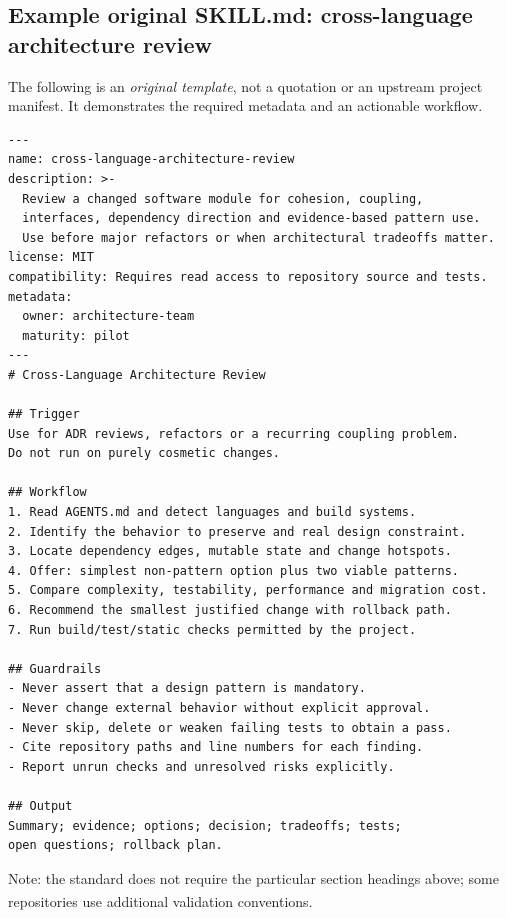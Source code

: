 \documentclass[11pt,letterpaper]{article}
\newcommand{\src}[1]{\textsuperscript{\textcolor{teal}{\cite{#1}}}}
\begin{document}
\subsection{Example original SKILL.md: cross-language architecture review}
The following is an \emph{original template}, not a quotation or an upstream project manifest. It demonstrates the required metadata and an actionable workflow.
\begin{lstlisting}[style=yamlstyle]
---
name: cross-language-architecture-review
description: >-
  Review a changed software module for cohesion, coupling,
  interfaces, dependency direction and evidence-based pattern use.
  Use before major refactors or when architectural tradeoffs matter.
license: MIT
compatibility: Requires read access to repository source and tests.
metadata:
  owner: architecture-team
  maturity: pilot
---
# Cross-Language Architecture Review

## Trigger
Use for ADR reviews, refactors or a recurring coupling problem.
Do not run on purely cosmetic changes.

## Workflow
1. Read AGENTS.md and detect languages and build systems.
2. Identify the behavior to preserve and real design constraint.
3. Locate dependency edges, mutable state and change hotspots.
4. Offer: simplest non-pattern option plus two viable patterns.
5. Compare complexity, testability, performance and migration cost.
6. Recommend the smallest justified change with rollback path.
7. Run build/test/static checks permitted by the project.

## Guardrails
- Never assert that a design pattern is mandatory.
- Never change external behavior without explicit approval.
- Never skip, delete or weaken failing tests to obtain a pass.
- Cite repository paths and line numbers for each finding.
- Report unrun checks and unresolved risks explicitly.

## Output
Summary; evidence; options; decision; tradeoffs; tests;
open questions; rollback plan.
\end{lstlisting}
Note: the standard does not require the particular section headings above; some repositories use additional validation conventions.\src{spec}
\end{document}
